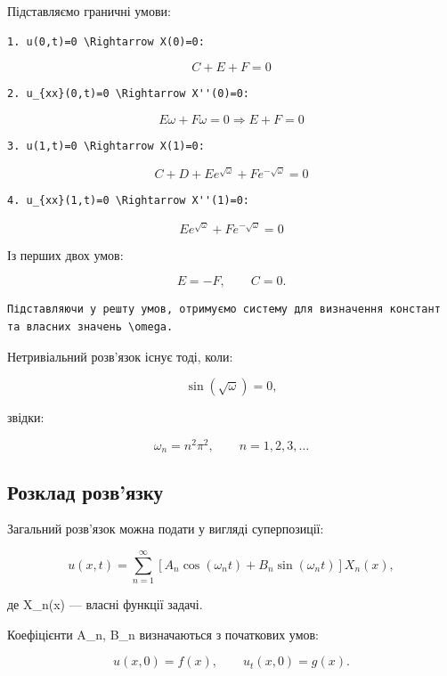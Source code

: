 \documentclass[
  ukrainian,
]{article}
\begin{document}
Підставляємо граничні умови:

\begin{verbatim}
1. u(0,t)=0 \Rightarrow X(0)=0:
\end{verbatim}

\[
C + E + F = 0
\]

\begin{verbatim}
2. u_{xx}(0,t)=0 \Rightarrow X''(0)=0:
\end{verbatim}

\[
E\omega + F\omega = 0 \Rightarrow E + F = 0
\]

\begin{verbatim}
3. u(1,t)=0 \Rightarrow X(1)=0:
\end{verbatim}

\[
C + D + E e^{\sqrt{\omega}} + F e^{-\sqrt{\omega}} = 0
\]

\begin{verbatim}
4. u_{xx}(1,t)=0 \Rightarrow X''(1)=0:
\end{verbatim}

\[
E e^{\sqrt{\omega}} + F e^{-\sqrt{\omega}} = 0
\]

Із перших двох умов:

\[
E = -F, \qquad C = 0.
\]

\begin{verbatim}
Підставляючи у решту умов, отримуємо систему для визначення констант та власних значень \omega.
\end{verbatim}

Нетривіальний розв'язок існує тоді, коли:

\[
\sin(\sqrt{\omega}) = 0,
\]

звідки:

\[
\omega_n = n^2 \pi^2, \qquad n = 1,2,3,\dots
\]

\subsection{Розклад
розв'язку}\label{ux440ux43eux437ux43aux43bux430ux434-ux440ux43eux437ux432ux44fux437ux43aux443}

Загальний розв'язок можна подати у вигляді суперпозиції:

\[
u(x,t) = \sum_{n=1}^{\infty} \left[
A_n \cos(\omega_n t) + B_n \sin(\omega_n t)
\right] X_n(x),
\]

де X\_n(x) --- власні функції задачі.

Коефіцієнти A\_n, B\_n визначаються з початкових умов:

\[
u(x,0) = f(x), \qquad u_t(x,0) = g(x).
\]
\end{document}
